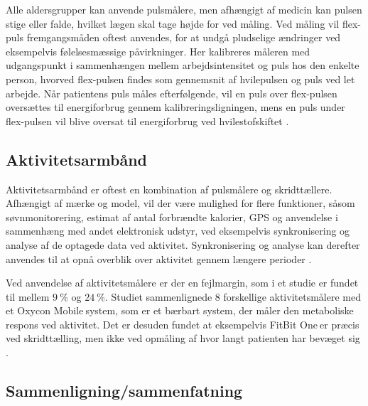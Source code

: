 Alle aldersgrupper kan anvende pulsmålere, men afhængigt af medicin kan pulsen stige eller falde, hvilket lægen skal tage højde for ved måling. Ved måling vil flex-puls fremgangsmåden oftest anvendes, for at undgå pludselige ændringer ved eksempelvis følelsesmæssige påvirkninger. Her kalibreres måleren med udgangspunkt i sammenhængen mellem arbejdsintensitet og puls hos den enkelte person, hvorved flex-pulsen findes som gennemsnit af hvilepulsen og puls ved let arbejde. Når patientens puls måles efterfølgende, vil en puls over flex-pulsen oversættes til energiforbrug gennem kalibreringsligningen, mens en puls under flex-pulsen vil blive oversat til energiforbrug ved hvilestofskiftet \citep{motionsraad2007}.


\subsection{Aktivitetsarmbånd}

Aktivitetsarmbånd er oftest en kombination af pulsmålere og skridttællere. Afhængigt af mærke og model, vil der være mulighed for flere funktioner, såsom søvnmonitorering, estimat af antal forbrændte kalorier, GPS og anvendelse i sammenhæng med andet elektronisk udstyr, ved eksempelvis synkronisering og analyse af de optagede data ved aktivitet. Synkronisering og analyse kan derefter anvendes til at opnå overblik over aktivitet gennem længere perioder \citep{pedersen2011, rudner2016, chiauzzi2014}.

Ved anvendelse af aktivitetsmålere er der en fejlmargin, som i et studie er fundet til mellem $9~\%$ og $24~\%$. Studiet sammenlignede $8$ forskellige aktivitetsmålere med et Oxycon Mobile\textregistered$~$system, som er et bærbart system, der måler den metaboliske respons ved aktivitet. Det er desuden fundet at eksempelvis FitBit One\textregistered$~$er præcis ved skridttælling, men ikke ved opmåling af hvor langt patienten har bevæget sig \citep{chiauzzi2014}.

\subsection{Sammenligning/sammenfatning}

